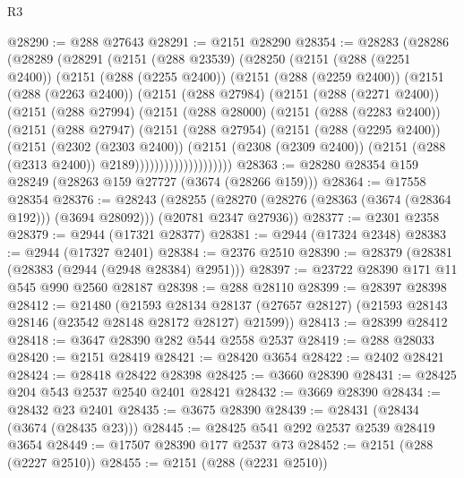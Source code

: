 \begin{lexlean}{R3}
\begin{coremodule}
@28290 := @288 @27643
@28291 := @2151 @28290
@28354 := @28283
    (@28286
      (@28289
        (@28291
          (@2151
            (@288 @23539)
            (@28250
              (@2151
                (@288 (@2251 @2400))
                (@2151
                  (@288 (@2255 @2400))
                  (@2151
                    (@288 (@2259 @2400))
                    (@2151
                      (@288 (@2263 @2400))
                      (@2151
                        (@288 @27984)
                        (@2151
                          (@288 (@2271 @2400))
                          (@2151
                            (@288 @27994)
                            (@2151
                              (@288 @28000)
                              (@2151
                                (@288 (@2283 @2400))
                                (@2151
                                  (@288 @27947)
                                  (@2151
                                    (@288 @27954)
                                    (@2151
                                      (@288 (@2295 @2400))
                                      (@2151
                                        (@2302 (@2303 @2400))
                                        (@2151
                                          (@2308 (@2309 @2400))
                                          (@2151 (@288 (@2313 @2400)) @2189))))))))))))))))))))
@28363 := @28280 @28354 @159 @28249 (@28263 @159 @27727 (@3674 (@28266 @159)))
@28364 := @17558 @28354
@28376 := @28243
    (@28255 (@28270 (@28276 (@28363 (@3674 (@28364 @192))) (@3694 @28092))) (@20781 @2347 @27936))
@28377 := @2301 @2358
@28379 := @2944 (@17321 @28377)
@28381 := @2944 (@17324 @2348)
@28383 := @2944 (@17327 @2401)
@28384 := @2376 @2510
@28390 := @28379 (@28381 (@28383 (@2944 (@2948 @28384) @2951)))
@28397 := @23722 @28390 @171 @11 @545 @990 @2560 @28187
@28398 := @288 @28110
@28399 := @28397 @28398
@28412 := @21480
    (@21593
      @28134
      @28137
      (@27657 @28127)
      (@21593 @28143 @28146 (@23542 @28148 @28172 @28127) @21599))
@28413 := @28399 @28412
@28418 := @3647 @28390 @282 @544 @2558 @2537
@28419 := @288 @28033
@28420 := @2151 @28419
@28421 := @28420 @3654
@28422 := @2402 @28421
@28424 := @28418 @28422 @28398
@28425 := @3660 @28390
@28431 := @28425 @204 @543 @2537 @2540 @2401 @28421
@28432 := @3669 @28390
@28434 := @28432 @23 @2401
@28435 := @3675 @28390
@28439 := @28431 (@28434 (@3674 (@28435 @23)))
@28445 := @28425 @541 @292 @2537 @2539 @28419 @3654
@28449 := @17507 @28390 @177 @2537 @73
@28452 := @2151 (@288 (@2227 @2510))
@28455 := @2151 (@288 (@2231 @2510))

\end{coremodule}
\end{lexlean}
